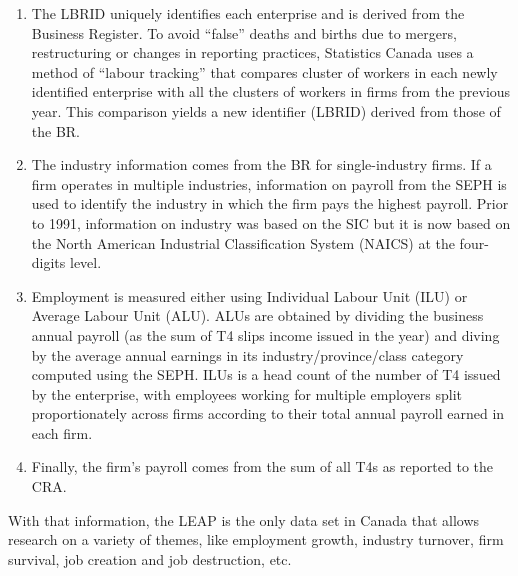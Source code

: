 \begin{enumerate}

\item The LBRID uniquely identifies each enterprise and is derived from the Business Register. To avoid ``false'' deaths and births due to mergers, restructuring or changes in reporting practices, Statistics Canada uses a method of ``labour tracking'' that compares cluster of workers in each newly identified enterprise with all the clusters of workers in firms from the previous year. This comparison yields a new identifier (LBRID) derived from those of the BR.

\item The industry information comes from the BR for single-industry firms. If a firm operates in multiple industries, information on payroll from the SEPH is used to identify the industry in which the firm pays the highest payroll. Prior to 1991, information on industry was based on the SIC but it is now based on the  North American Industrial Classification System (NAICS) at the four-digits level. 

\item Employment is measured either using Individual Labour Unit (ILU) or Average Labour Unit (ALU). ALUs are obtained by dividing the business annual payroll (as the sum of T4 slips income issued in the year) and diving by the average annual earnings in its industry/province/class category computed using the SEPH. ILUs is a head count of the number of T4 issued by the enterprise, with employees working for multiple employers split proportionately across firms according to their total annual payroll earned in each firm. 

\item Finally, the firm's payroll comes from the sum of all T4s as reported to the CRA.

\end{enumerate}
With that information, the LEAP is the only data set in Canada  that allows research on a variety of themes, like employment growth, industry turnover, firm survival, job creation and job destruction, etc. 
